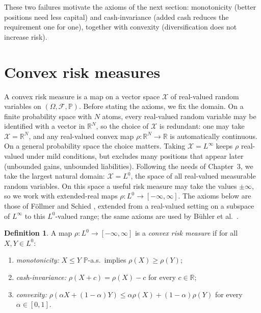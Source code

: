 \documentclass[11pt,a4paper]{report}
\numberwithin{equation}{chapter}
\theoremstyle{plain}
\theoremstyle{definition}
\newtheorem{definition}[proposition]{Definition}
\newcommand{\PP}{\mathbb{P}}
\newcommand{\R}{\mathbb{R}}
\newcommand{\F}{\mathcal{F}}
\begin{document}
These two failures motivate the axioms of the next section: monotonicity (better positions need less capital) and cash-invariance (added cash reduces the requirement one for one), together with convexity (diversification does not increase risk).

\section{Convex risk measures}\label{sec:crm}

A convex risk measure is a map on a vector space $\mathcal{X}$ of real-valued random variables on $(\Omega,\F,\PP)$. Before stating the axioms, we fix the domain. On a finite probability space with $N$ atoms, every real-valued random variable may be identified with a vector in $\R^N$, so the choice of $\mathcal{X}$ is redundant: one may take $\mathcal{X}=\R^N$, and any real-valued convex map $\rho\colon\R^N\to\R$ is automatically continuous. On a general probability space the choice matters. Taking $\mathcal{X}=L^\infty$ keeps $\rho$ real-valued under mild conditions, but excludes many positions that appear later (unbounded gains, unbounded liabilities). Following the needs of Chapter~3, we take the largest natural domain: $\mathcal{X}=L^0$, the space of all real-valued measurable random variables. On this space a useful risk measure may take the values $\pm\infty$, so we work with extended-real maps $\rho\colon L^0\to[-\infty,\infty]$. The axioms below are those of F\"ollmer and Schied \cite[Definitions~4.1 and~4.4]{foellmerschied}, extended from a real-valued setting on a subspace of $L^\infty$ to this $L^0$-valued range; the same axioms are used by B\"uhler et al.\ \cite[Definition~1]{buehler}.

\begin{definition}\label{def:crm}
    A map $\rho\colon L^0\to [-\infty,\infty]$ is a \emph{convex risk measure} if for all $X,Y\in L^0$:
    \begin{enumerate}[leftmargin=*,label=\textup{(\roman*)}]
        \item \emph{monotonicity:} $X\le Y$ $\PP$-a.s.\ implies $\rho(X)\ge\rho(Y)$;
        \item \emph{cash-invariance:} $\rho(X+c)=\rho(X)-c$ for every $c\in\R$;
        \item \emph{convexity:} $\rho(\alpha X+(1-\alpha)Y)\le\alpha\rho(X)+(1-\alpha)\rho(Y)$ for every $\alpha\in[0,1]$.
    \end{enumerate}
\end{definition}
\end{document}
